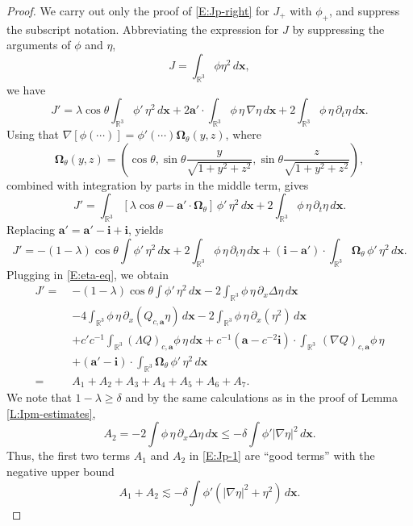 \documentclass[12pt,letterpaper]{amsart}
\theoremstyle{remark}
\numberwithin{equation}{section}
\numberwithin{theorem}{section}
\numberwithin{table}{section}
\begin{document}
\begin{proof}
We carry out only the proof of \eqref{E:Jp-right} for $J_+$ with $\phi_+$, and suppress the subscript notation.  Abbreviating the expression for $J$ by suppressing the arguments of $\phi$ and $\eta$,
$$
J = \int_{\mathbb{R}^3} \phi \eta^2 \, d\mathbf{x},
$$
we have
$$
J' = \lambda \cos\theta \int_{\mathbb{R}^3} \phi'  \, \eta^2 \, d\mathbf{x} + 2\mathbf{a}' \cdot \int_{\mathbb{R}^3} \phi \,\eta \, \nabla \eta  \, d\mathbf{x} + 2\int_{\mathbb{R}^3} \phi\, \eta \,\partial_t\eta \, d\mathbf{x}.
$$
Using that $\nabla [ \phi(\cdots) ] = \phi'(\cdots)\boldsymbol{\Omega}_\theta(y,z)$, where
$$
\boldsymbol{\Omega}_\theta(y,z) =  \left( \cos \theta, \sin \theta \frac{y}{\sqrt{1+y^2+z^2}}, \sin \theta \frac{z}{\sqrt{1+y^2+z^2}}\right),
$$
combined with integration by parts in the middle term, gives
$$
J' =  
\int_{\mathbb{R}^3} [\lambda \cos\theta - \mathbf{a}'\cdot \boldsymbol{\Omega}_\theta] \, \phi'  \, \eta^2  \, d\mathbf{x} + 2\int_{\mathbb{R}^3} \phi\, \eta \,\partial_t\eta \, d\mathbf{x}.
$$
Replacing $\mathbf{a}' = \mathbf{a}'-\mathbf{i} + \mathbf{i}$, yields
$$
J' = -(1-\lambda) \cos \theta \int \phi' \, \eta^2 \, d\mathbf{x} + 2\int_{\mathbb{R}^3} \phi\, \eta \,\partial_t\eta \, d\mathbf{x} + ( \mathbf{i}- \mathbf{a}')\cdot \int_{\mathbb{R}^3} \boldsymbol{\Omega}_\theta \, \phi'  \, \eta^2  \, d\mathbf{x}. 
$$
Plugging in \eqref{E:eta-eq}, we obtain
\begin{equation}
\label{E:Jp-1}  
\begin{aligned}
J' = \; & -(1-\lambda) \cos \theta \int \phi' \, \eta^2 \, d\mathbf{x} 
- 2\int_{\mathbb{R}^3} \phi\, \eta \, \partial_x \Delta \eta \, d\mathbf{x} \\
&- 4\int_{\mathbb{R}^3} \phi \, \eta \, \partial_x (Q_{c,\mathbf{a}} \eta) \, d\mathbf{x} 
-2 \int_{\mathbb{R}^3} \phi \, \eta \, \partial_x (\eta^2) \, d\mathbf{x}  \\
\quad&+ c' c^{-1} \int_{\mathbb{R}^3} (\Lambda Q)_{c,\mathbf{a}} \phi \, \eta  \, d\mathbf{x} 
+ c^{-1} ( \mathbf{a}- c^{-2}\mathbf{i}) \cdot \int_{\mathbb{R}^3} \, (\nabla Q)_{c,\mathbf{a}} \phi  \, \eta \\
\quad&+(\mathbf{a}' - \mathbf{i})\cdot \int_{\mathbb{R}^3} \boldsymbol{\Omega}_\theta \, \phi'  \, \eta^2  \, d\mathbf{x} \\
= \; & A_1+A_2+A_3+A_4+A_5+A_6+A_7.
\end{aligned}
\end{equation}
We note that $1-\lambda \geq \delta$ and by the same calculations as in the proof of Lemma \ref{L:Ipm-estimates}, 
$$
A_2=-2\int \phi \, \eta \, \partial_x \Delta \eta \, d \mathbf{x} \leq - \delta \int \phi' |\nabla \eta|^2 \,d \mathbf{x}.
$$
Thus, the first two terms $A_1$ and $A_2$ in \eqref{E:Jp-1} are ``good terms'' with the negative upper bound
\begin{equation}
\label{E:Jp-2}
A_1+A_2 \lesssim -\delta \int \phi' (|\nabla \eta|^2 +\eta^2) \, d\mathbf{x}.
\end{equation}  


\end{proof}
\end{document}
